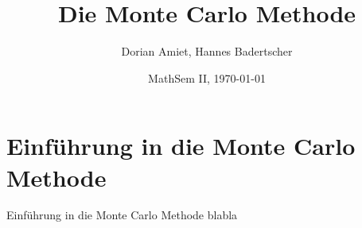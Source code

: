 \documentclass{beamer}
\title{Die Monte Carlo Methode}
\author[Amiet, Badertscher]{Dorian Amiet, Hannes Badertscher}
\date [MathSem II, FS14]{MathSem II, \today}
\begin{document}
\begin{frame}
	\titlepage
\end{frame}
	
\section[Einführung]{Einführung in die Monte Carlo Methode}
\begin{frame}{Einführung in die Monte Carlo Methode}
	blabla
\end{frame}
\end{document}

